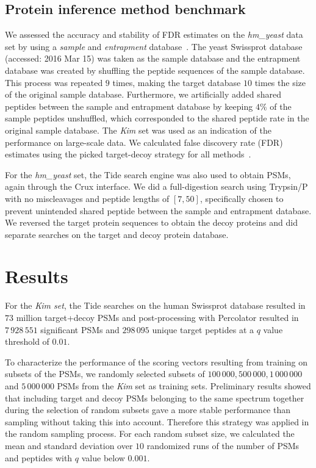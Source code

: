\documentclass{article}
\begin{document}
\subsection*{Protein inference method benchmark}

We assessed the accuracy and stability of FDR estimates on the {\em
hm\_yeast} data set by using a {\em sample} and {\em entrapment}
database~\cite{granholm2013determining}. The yeast Swissprot database
(accessed: 2016 Mar 15) was taken as the sample database and the
entrapment database was created by shuffling the peptide sequences of
the sample database. This process was repeated $9$ times, making the
target database $10$ times the size of the original sample database.
Furthermore, we artificially added shared peptides between the sample
and entrapment database by keeping $4\%$ of the sample peptides
unshuffled, which corresponded to the shared peptide rate in the
original sample database. The {\em Kim} set was used as an
indication of the performance on large-scale data. We calculated false
discovery rate (FDR) estimates using the picked target-decoy strategy
for all methods~\cite{savitski2015scalable}.

For the {\em hm\_yeast} set, the Tide search engine was also used to
obtain PSMs, again through the Crux interface. We did a full-digestion
search using Trypsin/P with no miscleavages and peptide lengths of
$[7,50]$, specifically chosen to prevent unintended shared peptide
between the sample and entrapment database. We reversed the target
protein sequences to obtain the decoy proteins and did separate
searches on the target and decoy protein database.

\section*{Results}

For the {\em Kim set}, the Tide searches on the human Swissprot
database resulted in $73$ million target+decoy PSMs and
post-processing with Percolator resulted in $7\,928\,551$ significant
PSMs and $298\,095$ unique target peptides at a $q$ value threshold of
$0.01$.

To characterize the performance of the scoring vectors resulting from
training on subsets of the PSMs, we randomly selected subsets of
$100\,000, 500\,000, 1\,000\,000$ and $5\,000\,000$ PSMs from the {\em
Kim} set as training sets. Preliminary results showed that including
target and decoy PSMs belonging to the same spectrum together during
the selection of random subsets gave a more stable performance than
sampling without taking this into account. Therefore this strategy was
applied in the random sampling process. For each random subset size,
we calculated the mean and standard deviation over $10$ randomized
runs of the number of PSMs and peptides with $q$ value below $0.001$.
\end{document}

